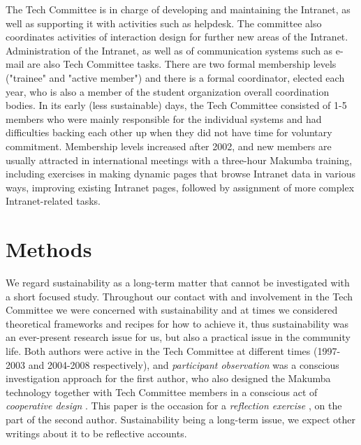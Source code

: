 \documentclass{acm_proc_article-sp}
\begin{document}
The Tech Committee is in charge of developing and maintaining the Intranet, as well as supporting it with activities such as helpdesk. The committee also coordinates activities of interaction design for further new areas of the Intranet. Administration of the Intranet, as well as of communication systems such as e-mail are also Tech Committee tasks. There are two formal membership levels ("trainee" and "active member") and there is a formal coordinator, elected each year, who is also a member of the student organization overall coordination bodies. In its early (less sustainable) days, the Tech Committee consisted of 1-5 members who were mainly responsible for the individual systems and had difficulties backing each other up when they did not have time for voluntary commitment. Membership levels increased after 2002, and new members are usually attracted in international meetings with a three-hour Makumba training, including exercises in making dynamic pages that browse Intranet data in various ways, improving existing Intranet pages, followed by assignment of more complex Intranet-related tasks.

\section{Methods}\label{sec:method}
We regard sustainability as a long-term matter that cannot be investigated with a short focused study. Throughout our contact with and involvement in the Tech Committee we were concerned with sustainability and at times we considered theoretical frameworks and recipes for how to achieve it, thus sustainability was an ever-present research issue for us, but also a practical issue in the community life. Both authors were active in the Tech Committee at different times (1997-2003 and 2004-2008 respectively), and {\it participant observation} was a conscious investigation approach for the first author, who also designed the Makumba technology together with Tech Committee members in a conscious act of {\it cooperative design} \cite{greenbaum_kyng91}. This paper is the occasion for a {\it reflection exercise} \cite{schon83}, on the part of the second author. Sustainability being a long-term issue, we expect other writings about it to be reflective accounts. 
\end{document}
